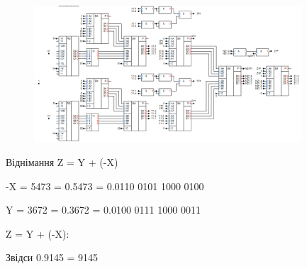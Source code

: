 \documentclass[12pt,a4paper]{article}
\begin{document}
    \begin{figure}[ht]
        \centering
        \includegraphics[width=0.89\textwidth]{2_4.png}
    \end{figure}

    \begin{center}
        \large Віднімання Z = Y + (-X)
    \end{center}

    -X = 5473 = 0.5473 = 0.0110 0101 1000 0100

    Y = 3672 = 0.3672 = 0.0100 0111 1000 0011

    \vspace{1em}

    Z = Y + (-X):

    \vspace{1em}


    \vspace{1em}

    Звідси 0.9145 = 9145

    \newpage
\end{document}
